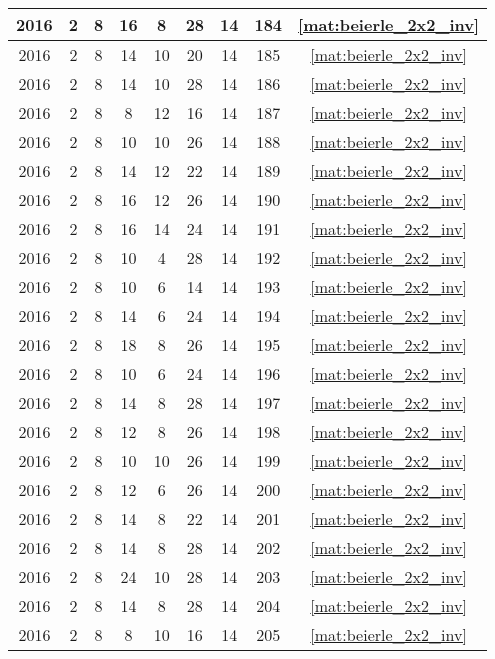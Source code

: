 \begin{longtable}{|c|c|c|c|c|c|c|c|c|}
2016 & 2 & 8 & 16 & 8 & 28 & 14 & 184 & \eqref{mat:beierle_2x2_inv} \\ \hline 
2016 & 2 & 8 & 14 & 10 & 20 & 14 & 185 & \eqref{mat:beierle_2x2_inv} \\ \hline 
2016 & 2 & 8 & 14 & 10 & 28 & 14 & 186 & \eqref{mat:beierle_2x2_inv} \\ \hline 
2016 & 2 & 8 & 8 & 12 & 16 & 14 & 187 & \eqref{mat:beierle_2x2_inv} \\ \hline 
2016 & 2 & 8 & 10 & 10 & 26 & 14 & 188 & \eqref{mat:beierle_2x2_inv} \\ \hline 
2016 & 2 & 8 & 14 & 12 & 22 & 14 & 189 & \eqref{mat:beierle_2x2_inv} \\ \hline 
2016 & 2 & 8 & 16 & 12 & 26 & 14 & 190 & \eqref{mat:beierle_2x2_inv} \\ \hline 
2016 & 2 & 8 & 16 & 14 & 24 & 14 & 191 & \eqref{mat:beierle_2x2_inv} \\ \hline 
2016 & 2 & 8 & 10 & 4 & 28 & 14 & 192 & \eqref{mat:beierle_2x2_inv} \\ \hline 
2016 & 2 & 8 & 10 & 6 & 14 & 14 & 193 & \eqref{mat:beierle_2x2_inv} \\ \hline 
2016 & 2 & 8 & 14 & 6 & 24 & 14 & 194 & \eqref{mat:beierle_2x2_inv} \\ \hline 
2016 & 2 & 8 & 18 & 8 & 26 & 14 & 195 & \eqref{mat:beierle_2x2_inv} \\ \hline 
2016 & 2 & 8 & 10 & 6 & 24 & 14 & 196 & \eqref{mat:beierle_2x2_inv} \\ \hline 
2016 & 2 & 8 & 14 & 8 & 28 & 14 & 197 & \eqref{mat:beierle_2x2_inv} \\ \hline 
2016 & 2 & 8 & 12 & 8 & 26 & 14 & 198 & \eqref{mat:beierle_2x2_inv} \\ \hline 
2016 & 2 & 8 & 10 & 10 & 26 & 14 & 199 & \eqref{mat:beierle_2x2_inv} \\ \hline 
2016 & 2 & 8 & 12 & 6 & 26 & 14 & 200 & \eqref{mat:beierle_2x2_inv} \\ \hline 
2016 & 2 & 8 & 14 & 8 & 22 & 14 & 201 & \eqref{mat:beierle_2x2_inv} \\ \hline 
2016 & 2 & 8 & 14 & 8 & 28 & 14 & 202 & \eqref{mat:beierle_2x2_inv} \\ \hline 
2016 & 2 & 8 & 24 & 10 & 28 & 14 & 203 & \eqref{mat:beierle_2x2_inv} \\ \hline 
2016 & 2 & 8 & 14 & 8 & 28 & 14 & 204 & \eqref{mat:beierle_2x2_inv} \\ \hline 
2016 & 2 & 8 & 8 & 10 & 16 & 14 & 205 & \eqref{mat:beierle_2x2_inv} \\ \hline 

\end{longtable}
